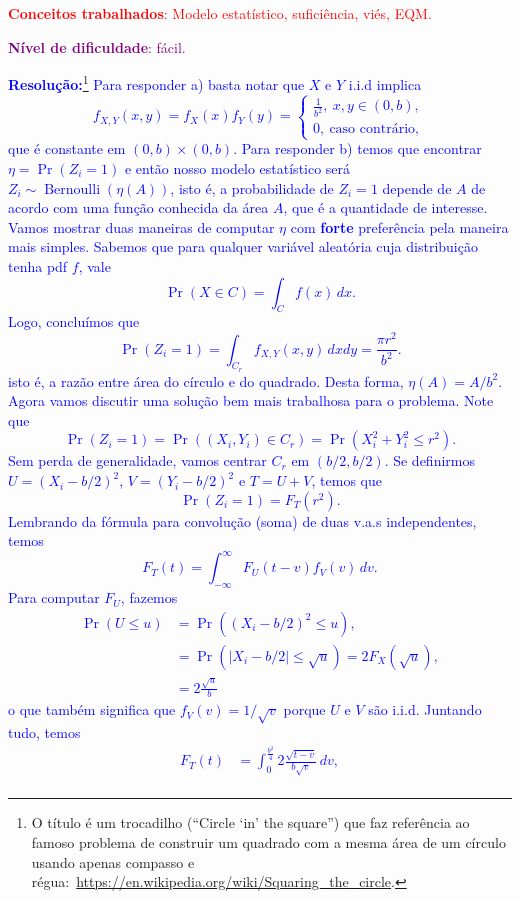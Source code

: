 \documentclass[a4paper,10pt, notitlepage]{report}
\newcommand{\pr}{\operatorname{Pr}} %
\begin{document}
\textcolor{red}{\textbf{Conceitos trabalhados}: Modelo estatístico, suficiência, viés, EQM.}

\textcolor{purple}{\textbf{Nível de dificuldade}: fácil.}

\textcolor{blue}{
\textbf{Resolução:}\footnote{O título é um trocadilho (``Circle `in' the square'') que faz referência ao famoso problema de construir um quadrado com a mesma área de um círculo usando apenas compasso e régua:~\url{https://en.wikipedia.org/wiki/Squaring_the_circle}.}
Para responder a) basta notar que $X$ e $Y$ i.i.d implica
$$
f_{X,Y}(x, y) = f_X(x)f_Y(y) = \begin{cases}
                                \frac{1}{b^2},\: x, y \in (0, b),\\
     0,\:\text{caso contrário},
                               \end{cases}
$$
que é constante em $(0, b) \times (0, b)$.
Para responder b) temos que encontrar $\eta = \pr(Z_i = 1)$ e então nosso modelo estatístico será $Z_i \sim \operatorname{Bernoulli}(\eta(A))$, isto é, a probabilidade de $Z_i = 1$ depende de $A$ de acordo com uma função conhecida da área $A$, que é a quantidade de interesse.
Vamos mostrar duas maneiras de computar $\eta$ com \textbf{forte} preferência pela maneira mais simples.
Sabemos que para qualquer variável aleatória cuja distribuição tenha pdf $f$, vale
$$
\pr(X \in C) = \int_{C} f(x)\,dx.
$$
Logo, concluímos que
$$
\pr(Z_i = 1) = \int_{C_r} f_{X, Y}(x, y)\,dxdy = \frac{\pi r^2}{b^2}.
$$
isto é, a razão entre área do círculo e do quadrado.
Desta forma, $\eta(A) = A/b^2$.
Agora vamos discutir uma solução bem mais trabalhosa para o problema.
Note que 
$$
\pr(Z_i = 1) = \pr((X_i, Y_i) \in C_r) = \pr(X_i^2 + Y_i^2 \leq r^2).
$$
Sem perda de generalidade, vamos centrar $C_r$ em $(b/2, b/2)$.
Se definirmos  $U = (X_i-b/2)^2$, $V=(Y_i-b/2)^2$ e $T = U + V$, temos que
$$
\pr(Z_i = 1) = F_T(r^2).
$$
Lembrando da fórmula para convolução (soma) de duas v.a.s independentes, temos
$$
F_T(t) = \int_{-\infty}^\infty F_U(t-v)f_V(v)\,dv.
$$
Para computar $F_U$, fazemos
\begin{align*}
 \pr(U \leq u) &= \pr( (X_i-b/2)^2 \leq u),\\
 &= \pr(|X_i-b/2| \leq \sqrt{u}) = 2F_X(\sqrt{u}),\\
 &= 2\frac{\sqrt{u}}{b}
\end{align*}
o que também significa que $f_V(v) = 1/\sqrt{v}$ porque $U$ e $V$ são i.i.d.
Juntando tudo, temos
\begin{align*}
 F_T(t) &= \int_{0}^{\frac{b^2}{4}}  2\frac{\sqrt{t-v}}{b\sqrt{v}} \,dv ,\\

\end{align*}}
\end{document}
